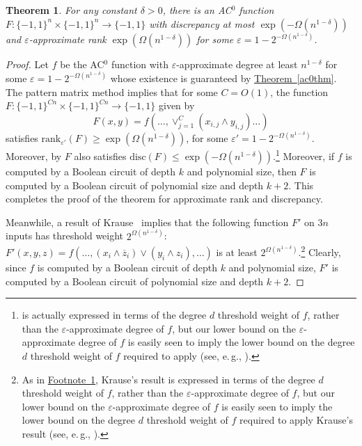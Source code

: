 \documentclass[11pt]{article}
\numberwithin{equation}{section}
\newtheorem{theorem}{Theorem}[section]
\theoremstyle{definition}
\theoremstyle{plain}
\newcommand{\eg}{e.\,g.}
\newcommand{\expref}[2]{\hyperref[#2]{#1~\ref{#2}}}
\newcommand{\bits}{\{-1,1\}}
\newcommand{\eps}{\varepsilon}
\begin{document}
\begin{theorem} \label{thm:diediedie}
	For any constant $\delta > 0$, there is an AC$^0$ function $F \colon \bits^n \times \bits^n \to \bits$ with discrepancy at most $\exp(-\Omega(n^{1-\delta}))$
	and $\eps$-approximate rank $\exp(\Omega(n^{1-\delta}))$ for some $\eps = 1-2^{-\Omega(n^{1-\delta})}$. 
\end{theorem}
\begin{proof}
	Let $f$ be the AC$^0$ function with $\eps$-approximate degree at least $n^{1-\delta}$ for some $\eps=1-2^{-\Omega(n^{1-\delta})}$ whose existence is guaranteed
	by \expref{Theorem}{ac0thm}. The pattern matrix method \cite[Theorem 8.1]{patmat} implies that for some $C=O(1)$,
	the function 
	$F \colon \bits^{Cn}\times \bits^{Cn} \to \bits$ given by
	$$F(x, y) = f\left(\dots, \vee_{j=1}^C \left(x_{i, j} \wedge y_{i, j}\right) \dots\right)$$
	satisfies
	$\text{rank}_{\eps'}(F) \geq \exp(\Omega(n^{1-\delta}))$,
	for some $\eps'=1-2^{-\Omega(n^{1-\delta})}$.  
	Moreover, by \cite[Theorem 7.3]{patmat} $F$ also satisfies $\mathrm{disc}(F) \leq \exp(-\Omega(n^{1-\delta}))$.\footnote{\label{foot}\cite[Theorem 7.3]{patmat}
		is actually expressed in terms of the degree $d$ threshold weight of $f$, rather than the $\eps$-approximate degree of $f$,
		but our lower bound on the $\eps$-approximate degree of $f$ is easily seen to imply the lower bound on the degree $d$ threshold weight of $f$
required to apply  \cite[Theorem 7.3]{patmat} (see, \eg, \cite[Lemma 20]{bt14}).} 
	Moreover, if $f$ is computed by a Boolean circuit of depth $k$ and polynomial size,
	then $F$ is computed by a Boolean circuit of polynomial size and depth $k+2$. 
	This completes the proof of the theorem for approximate rank and discrepancy.
	
	Meanwhile, a result of Krause~\cite{krause} implies that the following
	function $F'$ on $3n$ inputs has threshold weight $2^{\Omega(n^{1-\delta})}$: 
	$F'(x, y, z)= f(\dots, (x_i \wedge \overline{z}_i )\vee  (y_i \wedge z_i), \dots )$ is at least $2^{\Omega(n^{1-\delta})}$.\footnote{As
		in \expref{Footnote}{foot}, Krause's result is expressed in terms of the degree $d$ 
		threshold weight of $f$, rather than the $\eps$-approximate degree of $f$,
		but our lower bound on the $\eps$-approximate degree of $f$ is easily seen to imply the lower bound on the degree $d$ threshold weight of $f$
		required to apply Krause's result (see, \eg, \cite[Lemma 20]{bt14}).}
	Clearly, since $f$ is computed by a Boolean circuit of depth $k$ and polynomial size,
	$F'$ is computed by a Boolean circuit of polynomial size and depth $k+2$. 
\end{proof}
\end{document}
